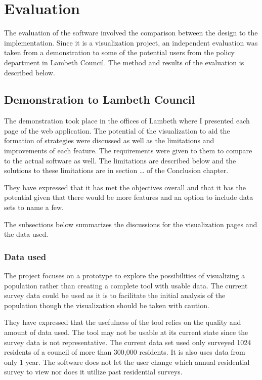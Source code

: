\chapter{Evaluation}

The evaluation of the software involved the comparison between the design to the implementation. Since it is a visualization project, an independent evaluation was taken from a demonstration to some of the potential users from the policy department in Lambeth Council. The method and results of the evaluation is described below.

\section{Demonstration to Lambeth Council}

The demonstration took place in the offices of Lambeth where I presented each page of the web application. The potential of the visualization to aid the formation of strategies were discussed as well as the limitations and improvements of each feature. The requirements were given to them to compare to the actual software as well. The limitations are described below and the solutions to these limitations are in section … of the Conclusion chapter.\par

They have expressed that it has met the objectives overall and that it has the potential given that there would be more features and an option to include data sets to name a few.

The subsections below summarizes the discussions for the visualization pages and the data used.

\subsection{Data used}
The project focuses on a prototype to explore the possibilities of visualizing a population rather than creating a complete tool with usable data. The current survey data could be used as it is to facilitate the initial analysis of the population though the visualization should be taken with caution. \par

They have expressed that the usefulness of the tool relies on the quality and amount of data used. The tool may not be usable at its current state since the survey data is not representative. The current data set used only surveyed 1024 residents of a council of more than 300,000 residents. It is also uses data from only 1 year. The software does not let the user change which annual residential survey to view nor does it utilize past residential surveys.

